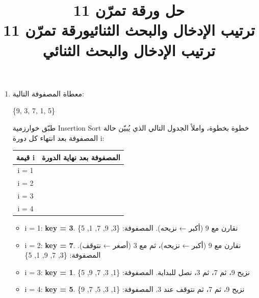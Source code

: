 \documentclass[14pt]{extarticle}
\title{حل ورقة تمرّن 11 \\ ترتيب الإدخال والبحث الثنائي}
\title{ورقة تمرّن 11 \\ ترتيب الإدخال والبحث الثنائي}
\begin{document}
\maketitle
\thispagestyle{fancy}

\begin{enumerate}[itemsep=2em]

\item
معطاة المصفوفة التالية:

\begin{center}
\textenglish{\{9, 3, 7, 1, 5\}}
\end{center}

طبّق خوارزمية \textenglish{Insertion Sort} خطوة بخطوة، واملأ الجدول التالي الذي يُبيّن حالة المصفوفة بعد انتهاء كل دورة \textenglish{i}:

\begin{center}
\begin{tabular}{|c|c|}
\hline
\textbf{قيمة \textenglish{i}} & \textbf{المصفوفة بعد نهاية الدورة} \\
\hline
\textenglish{i = 1} & \hspace{6cm} \\[10pt]
\hline
\textenglish{i = 2} & \\[10pt]
\hline
\textenglish{i = 3} & \\[10pt]
\hline
\textenglish{i = 4} & \\[10pt]
\hline
\end{tabular}
\end{center}

\ifwithsols
\begin{boxSolution}
\begin{itemize}[itemsep=1pt]
    \item \textenglish{i = 1}: \textbf{key = 3}. نقارن مع 9 (أكبر ← نزيحه). المصفوفة: \textenglish{\{3, 9, 7, 1, 5\}}
    \item \textenglish{i = 2}: \textbf{key = 7}. نقارن مع 9 (أكبر ← نزيحه)، ثم مع 3 (أصغر ← نتوقف). المصفوفة: \textenglish{\{3, 7, 9, 1, 5\}}
    \item \textenglish{i = 3}: \textbf{key = 1}. نزيح 9، ثم 7، ثم 3، نصل للبداية. المصفوفة: \textenglish{\{1, 3, 7, 9, 5\}}
    \item \textenglish{i = 4}: \textbf{key = 5}. نزيح 9، ثم 7، ثم نتوقف عند 3. المصفوفة: \textenglish{\{1, 3, 5, 7, 9\}}
\end{itemize}
\end{boxSolution}
\clearpage
\fi


\end{enumerate}
\end{document}
